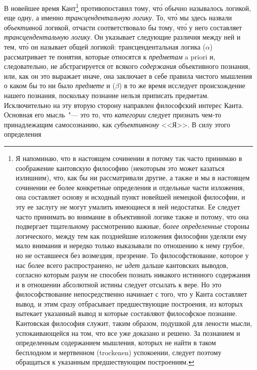 В новейшее время Кант\footnote{Я напоминаю, что в настоящем сочинении я потому так
  часто принимаю в соображение кантовскую философию (некоторым
  это может казаться излишним), что, как бы ни рассматривали
  другие, а также и мы в настоящем сочинении ее более конкретные
  определения и отдельные части изложения, она составляет
  основу и исходный пункт новейшей немецкой философии,
  и эту ее заслугу не могут умалить имеющиеся в ней недостатки.
  Ее следует часто принимать во внимание в объективной логике
  также и потому, что она подвергает тщательному рассмотрению
  важные, \emph{более определенные} стороны логического, между тем как
  позднейшие изложения философии уделяли ему мало внимания
  и нередко только выказывали по отношению к нему грубое, но
  не оставшееся без возмездия, презрение. То философствование,
  которое у нас более всего распространено, \emph{не идет} дальше кантовских
  выводов, согласно которым разум не способен познать
  никакого истинного содержания и в отношении абсолютной истины
  следует отсылать к вере. Но это философствование непосредственно
  начинает с того, что у Канта составляет вывод, и этим
  сразу отбрасывает предшествующие построения, из которых вытекает
  указанный вывод и которые составляют философское познание.
  Кантовская философия служит, таким образом, подушкой
  для лености мысли, успокаивающейся на том, что все уже доказано
  и решено. За познанием и определенным содержанием мышления,
  которых не найти в таком бесплодном и мертвенном
  (trockenen) успокоении, следует поэтому обращаться к указанным
  предшествующим построениям.} противопоставил тому, чт\'о
обычно называлось логикой, еще одну, а именно \emph{трансцендентальную
логику}. То, чт\'о мы здесь назвали \emph{объективной}
логикой, отчасти соответствовало бы тому, чт\'о
у него составляет \emph{трансцендентальную логику}. Он указывает
следующие различия между ней и тем, чт\'о он
называет общей логикой: трансцендентальная логика ($\alpha$)
рассматривает те понятия, которые относятся к \emph{предметам}
a priori и, следовательно, не абстрагируется от всякого
\emph{содержания} объективного познания, или, как он это
выражает иначе, она заключает в себе правила чистого
мышления о каком бы то ни было \emph{предмете} и ($\beta$) в то
же время исследует происхождение нашего познания,
поскольку познание нельзя приписать предметам. Исключительно
на эту вторую сторону направлен философский
интерес Канта. Основная его мысль~"--- это то, что \emph{категории}
следует признать чем-то принадлежащим самосознанию,
как \emph{субъективному} <<Я>>. В силу этого определения
